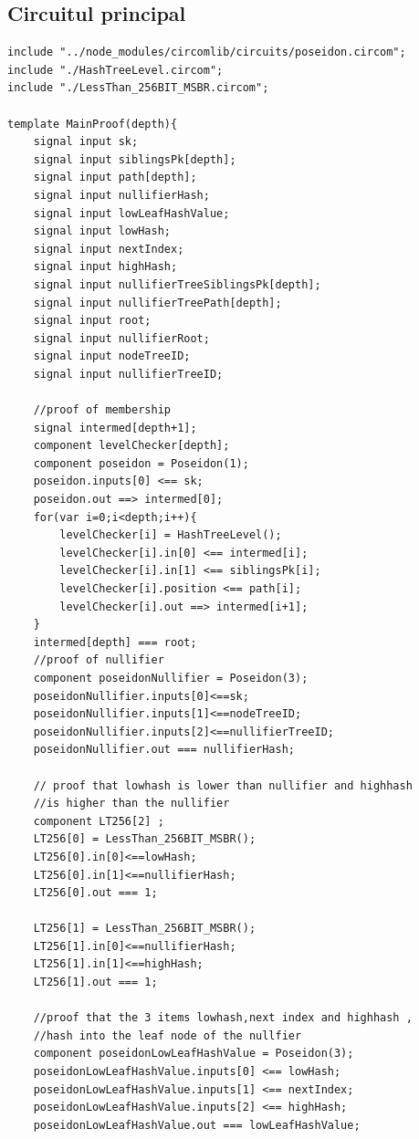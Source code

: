 \documentclass[12pt, letterpaper]{article}
\begin{document}
\subsection{Circuitul principal}
\begin{lstlisting}[caption="MainProof.circom"]
include "../node_modules/circomlib/circuits/poseidon.circom";
include "./HashTreeLevel.circom";
include "./LessThan_256BIT_MSBR.circom";

template MainProof(depth){
    signal input sk;
    signal input siblingsPk[depth];
    signal input path[depth];
    signal input nullifierHash;
    signal input lowLeafHashValue;
    signal input lowHash;
    signal input nextIndex;
    signal input highHash;
    signal input nullifierTreeSiblingsPk[depth];
    signal input nullifierTreePath[depth];
    signal input root;
    signal input nullifierRoot;
    signal input nodeTreeID;
    signal input nullifierTreeID;
    
    //proof of membership
    signal intermed[depth+1];
    component levelChecker[depth];
    component poseidon = Poseidon(1);
    poseidon.inputs[0] <== sk;
    poseidon.out ==> intermed[0];
    for(var i=0;i<depth;i++){
        levelChecker[i] = HashTreeLevel();
        levelChecker[i].in[0] <== intermed[i];
        levelChecker[i].in[1] <== siblingsPk[i];
        levelChecker[i].position <== path[i];
        levelChecker[i].out ==> intermed[i+1];
    }
    intermed[depth] === root;
    //proof of nullifier 
    component poseidonNullifier = Poseidon(3);
    poseidonNullifier.inputs[0]<==sk;
    poseidonNullifier.inputs[1]<==nodeTreeID;
    poseidonNullifier.inputs[2]<==nullifierTreeID;
    poseidonNullifier.out === nullifierHash;

    // proof that lowhash is lower than nullifier and highhash
    //is higher than the nullifier
    component LT256[2] ;
    LT256[0] = LessThan_256BIT_MSBR();
    LT256[0].in[0]<==lowHash;
    LT256[0].in[1]<==nullifierHash;
    LT256[0].out === 1;

    LT256[1] = LessThan_256BIT_MSBR();
    LT256[1].in[0]<==nullifierHash;
    LT256[1].in[1]<==highHash;
    LT256[1].out === 1;

    //proof that the 3 items lowhash,next index and highhash ,
    //hash into the leaf node of the nullfier
    component poseidonLowLeafHashValue = Poseidon(3);
    poseidonLowLeafHashValue.inputs[0] <== lowHash;
    poseidonLowLeafHashValue.inputs[1] <== nextIndex;
    poseidonLowLeafHashValue.inputs[2] <== highHash;
    poseidonLowLeafHashValue.out === lowLeafHashValue;


\end{lstlisting}
\end{document}
